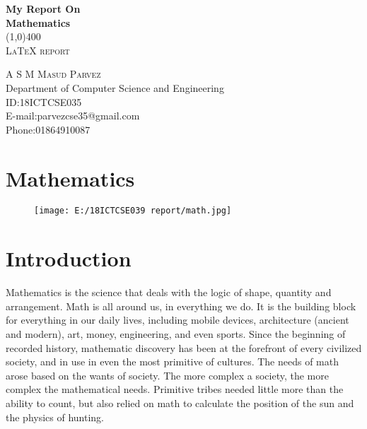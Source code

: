 \documentclass{article}
\begin{document}
\begin{titlepage}
\begin{center}
\huge{\bfseries My Report On}\\
\huge{\bfseries Mathematics}\\
\line(1,0){400}\\
\textsc{\LARGE LaTeX report}\\
\end{center}

\begin{flushright}
\textsc{\LARGE A S M Masud Parvez\\}
Department of Computer Science and Engineering\\
ID:18ICTCSE035\\
E-mail:parvezcse35@gmail.com\\
Phone:01864910087\\
\end{flushright}

\end{titlepage}

\tableofcontents
\thispagestyle{empty}
\cleardoublepage


\setcounter{page}{1}
\section{Mathematics}
\begin{figure}[H]
\texttt{[image: E:/18ICTCSE039 report/math.jpg]}
\end{figure}

\section{Introduction}
Mathematics is the science that deals with the logic of shape, quantity and arrangement. Math is all around us, in everything we do. It is the building block for everything in our daily lives, including mobile devices, architecture (ancient and modern), art, money, engineering, and even sports.\newline \newline
Since the beginning of recorded history, mathematic discovery has been at the forefront of every civilized society, and in use in even the most primitive of cultures. The needs of math arose based on the wants of society. The more complex a society, the more complex the mathematical needs. Primitive tribes needed little more than the ability to count, but also relied on math to calculate the position of the sun and the physics of hunting.
\end{document}
